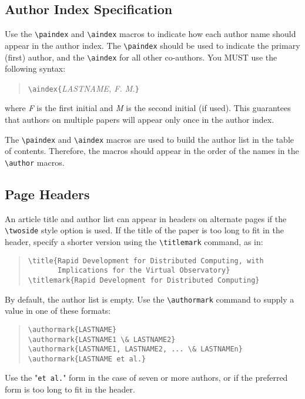 \documentclass[11pt,twoside]{article}
\def\arg#1{{\it#1\/}}
\begin{document}
\subsection{Author Index Specification}

Use the \verb+\paindex+ and \verb+\aindex+ macros to indicate how each
author name should appear in the author index.  The \verb+\paindex+ should
be used to indicate the primary (first) author, and the \verb+\aindex+
for all other co-authors.  You MUST use the following syntax: 
\begin{quote}
\verb+\aindex{+\arg{LASTNAME, F. M.}\verb+}+
\end{quote}
where {\it F} is the first initial and {\it M} is the second initial (if
used).  This guarantees that authors on multiple papers
will appear only once in the author index.

The \verb+\paindex+ and \verb+\aindex+ macros are used to build the author
list in the table of contents.  Therefore, the macros should appear in the 
order of the names in the \verb+\author+ macros.

\subsection{Page Headers}

An article title and author list can appear in headers on alternate
pages if the \verb+\twoside+ style option is used.  If the title of the
paper is too long to fit in the header, specify a shorter version using
the \verb+\titlemark+ command, as in:
\begin{quote}
\verb+\title{Rapid Development for Distributed Computing, with+\\
\verb+       Implications for the Virtual Observatory}+\\
\verb+\titlemark{Rapid Development for Distributed Computing}+
\end{quote}

By default, the author list is empty.  Use the \verb+\authormark+
command to supply a value in one of these formats:
\begin{quote}
\verb+\authormark{LASTNAME}+\\
\verb+\authormark{LASTNAME1 \& LASTNAME2}+\\
\verb+\authormark{LASTNAME1, LASTNAME2, ... \& LASTNAMEn}+\\
\verb+\authormark{LASTNAME et al.}+
\end{quote}
Use the "\verb+et al.+" form in the case of seven or more authors, or if
the preferred form is too long to fit in the header.
\end{document}
